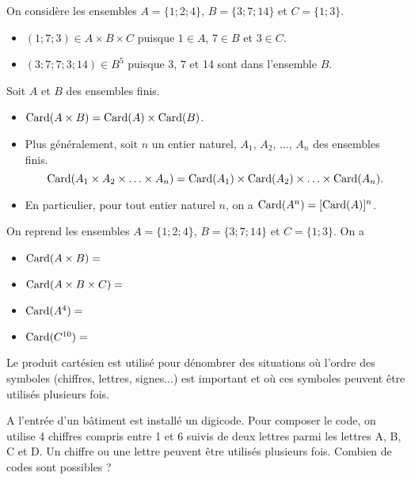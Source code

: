 \documentclass[11pt,fleqn, openany]{book} %
\begin{document}
\begin{example} On considère les ensembles $A=\{1;2;4\}$, $B=\{3;7;14\}$ et $C=\{1;3\}$.
\begin{itemize}
\item $(1;7;3) \in A \times B \times C$ puisque $1 \in A$, $7 \in B$ et $3 \in C$.
\item $(3;7;7;3;14) \in B^5$ puisque $3$, $7$ et 14 sont dans l'ensemble $B$.
\end{itemize}\end{example}

\begin{proposition} Soit $A$ et $B$ des ensembles finis. 
\begin{itemize}
\item $\mathrm{Card} (A \times B)=\mathrm{Card}(A) \times  \mathrm{Card} (B)$.
\item Plus généralement, soit $n$ un entier naturel, $A_1$, $A_2$, ..., $A_n$ des ensembles finis. \[\mathrm{Card}(A_1 \times A_2 \times \ldots \times A_n)=\mathrm{Card}(A_1) \times \mathrm{Card}(A_2) \times \ldots \times \mathrm{Card}(A_n).\]
\item En particulier, pour tout entier naturel $n$, on a $\mathrm{Card}(A^n)=[\mathrm{Card}(A)]^n$.
\end{itemize}\end{proposition}


\begin{example} On reprend les ensembles $A=\{1;2;4\}$, $B=\{3;7;14\}$ et $C=\{1;3\}$. On a
\begin{itemize}
\item $\mathrm{Card}(A \times B)= $
\item $\mathrm{Card}(A \times B \times C) = $
\item $\mathrm{Card}(A^4)=$
\item $\mathrm{Card}(C^{10})=$
\end{itemize}\end{example}

\newpage

\begin{proposition} Le produit cartésien est utilisé pour dénombrer des situations où l'ordre des symboles (chiffres, lettres, signes...) est important et où ces symboles peuvent être utilisés plusieurs fois.\end{proposition}

\begin{example} A l'entrée d'un bâtiment est installé un digicode. Pour composer le code, on utilise 4 chiffres compris entre 1 et 6 suivis de deux lettres parmi les lettres A, B, C et D. Un chiffre ou une lettre peuvent être utilisés plusieurs fois. Combien de codes sont possibles ?


\vskip40pt
\end{example}
\end{document}
